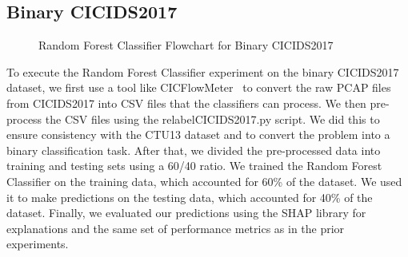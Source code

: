 \subsection{Binary CICIDS2017}\label{subsec:RandomForestBinaryCICIDS2017}
\begin{figure}[H]
\centering
{}
\caption{Random Forest Classifier Flowchart for Binary CICIDS2017}\label{fig:RandomForestFlowBinaryCICIDS2017}
\end{figure}

To execute the Random Forest Classifier experiment on the binary CICIDS2017 dataset, we first use a tool like CICFlowMeter~\cite{lashkari2017characterization} to convert the raw PCAP files from CICIDS2017 into CSV files that the classifiers can process. We then pre-process the CSV files using the relabelCICIDS2017.py script. We did this to ensure consistency with the CTU13 dataset and to convert the problem into a binary classification task. After that, we divided the pre-processed data into training and testing sets using a 60/40 ratio. We trained the Random Forest Classifier on the training data, which accounted for 60\% of the dataset. We used it to make predictions on the testing data, which accounted for 40\% of the dataset. Finally, we evaluated our predictions using the SHAP library for explanations and the same set of performance metrics as in the prior experiments.

